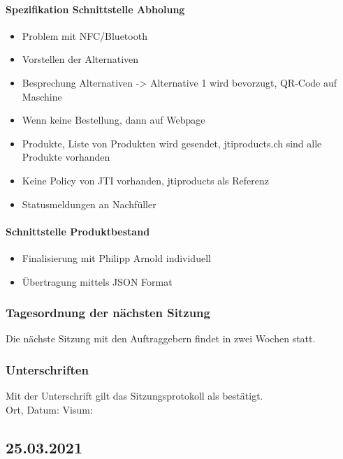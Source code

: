 \paragraph{Spezifikation Schnittstelle Abholung}
	\begin{itemize}
		\item Problem mit NFC/Bluetooth
		\item Vorstellen der Alternativen
		\item Besprechung Alternativen -> Alternative 1 wird bevorzugt, QR-Code auf Maschine 
		\item Wenn keine Bestellung, dann auf Webpage
		\item Produkte, Liste von Produkten wird gesendet, jtiproducts.ch sind alle Produkte vorhanden
		\item Keine Policy von JTI vorhanden, jtiproducts als Referenz
		\item Statusmeldungen an Nachfüller
	\end{itemize}

\paragraph{Schnittstelle Produktbestand}
	\begin{itemize}
		\item Finalisierung mit Philipp Arnold individuell
		\item Übertragung mittels JSON Format
	\end{itemize}

\subsubsection{Tagesordnung der nächsten Sitzung}
Die nächste Sitzung mit den Auftraggebern findet in zwei Wochen statt. 
\subsubsection{Unterschriften}

Mit der Unterschrift gilt das Sitzungsprotokoll als bestätigt.\\

Ort, Datum:	\underline{\hspace*{6cm}}	\hspace*{1cm} Visum:	\underline{\hspace*{4cm}}

\subsection{25.03.2021}\label{Beteuermeeting2}
